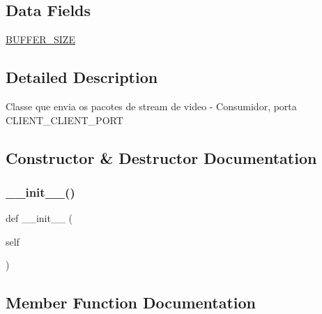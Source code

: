 \subsection*{Data Fields}
\begin{DoxyCompactItemize}
\item 
\hyperlink{class_client_1_1_client_sender_aa300d171bb6f6573a2de65c5342303c9}{B\+U\+F\+F\+E\+R\+\_\+\+S\+I\+ZE}
\end{DoxyCompactItemize}


\subsection{Detailed Description}
\begin{DoxyVerb}Classe que envia os pacotes de stream de video - Consumidor, porta CLIENT_CLIENT_PORT\end{DoxyVerb}
 

\subsection{Constructor \& Destructor Documentation}
\mbox{\label{class_client_1_1_client_sender_ae64f0875afe3067b97ba370b354b9213}} 
\subsubsection{\texorpdfstring{\+\_\+\+\_\+init\+\_\+\+\_\+()}{\_\_init\_\_()}}
{\footnotesize\ttfamily def \+\_\+\+\_\+init\+\_\+\+\_\+ (\begin{DoxyParamCaption}\item[{}]{self }\end{DoxyParamCaption})}



\subsection{Member Function Documentation}
\mbox{\label{class_client_1_1_client_sender_ad22709b2e67308af35f55680d5a026e0}} 
